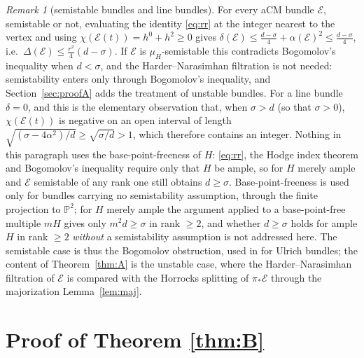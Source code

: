 \documentclass[11pt]{amsart}
\theoremstyle{remark}
\newtheorem{remark}[theorem]{Remark}
\theoremstyle{definition}
\newcommand{\PP}{\mathbb{P}}
\newcommand{\cE}{\mathcal{E}}
\begin{document}
\begin{remark}[semistable bundles and line bundles]\label{rem:rr}
For every aCM bundle $\cE$, semistable or not, evaluating the identity \eqref{eq:rr} at the integer nearest to the vertex and using $\chi(\cE(t))=h^0+h^2\ge0$ gives $\delta(\cE)\le\tfrac{d-\sigma}4+\alpha(\cE)^2\le\tfrac{d-\sigma}4$, i.e.\ $\Delta(\cE)\le\tfrac{r^2}{4}(d-\sigma)$. If $\cE$ is $\mu_H$-semistable this contradicts Bogomolov's inequality when $d<\sigma$, and the Harder--Narasimhan filtration is not needed: semistability enters only through Bogomolov's inequality, and Section~\ref{sec:proofA} adds the treatment of unstable bundles. For a line bundle $\delta=0$, and this is the elementary observation that, when $\sigma>d$ (so that $\sigma>0$), $\chi(\cE(t))$ is negative on an open interval of length $\sqrt{(\sigma-4\alpha^2)/d}\ge\sqrt{\sigma/d}>1$, which therefore contains an integer. Nothing in this paragraph uses the base-point-freeness of $H$: \eqref{eq:rr}, the Hodge index theorem and Bogomolov's inequality require only that $H$ be ample, so for $H$ merely ample and $\cE$ semistable of any rank one still obtains $d\ge\sigma$. Base-point-freeness is used only for bundles carrying no semistability assumption, through the finite projection to $\PP^2$; for $H$ merely ample the argument applied to a base-point-free multiple $mH$ gives only $m^2d\ge\sigma$ in rank $\ge2$, and whether $d\ge\sigma$ holds for ample $H$ in rank $\ge2$ \emph{without} a semistability assumption is not addressed here. The semistable case is thus the Bogomolov obstruction, used in \cite{An} for Ulrich bundles; the content of Theorem~\ref{thm:A} is the unstable case, where the Harder--Narasimhan filtration of $\cE$ is compared with the Horrocks splitting of $\pi_*\cE$ through the majorization Lemma~\ref{lem:maj}.
\end{remark}


\section{Proof of Theorem \ref{thm:B}}\label{sec:proofB}
\end{document}
